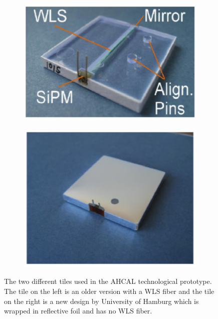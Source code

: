 \begin{figure}[htbp!]
  \centering
  \begin{subfigure}[t]{0.43\textwidth}
    \includegraphics[width=1.\linewidth]{chap3/fig/AHCALTile_old.png}
    \caption{} \label{fig:AHCALTile_old}
  \end{subfigure}
  \hspace{2cm}
  \begin{subfigure}[t]{0.37\textwidth}
    \includegraphics[width=1.\linewidth]{chap3/fig/AHCALTile_wrapped.png}
    \caption{} \label{fig:AHCALTile_new}
  \end{subfigure}
  \caption{The two different tiles used in the AHCAL technological prototype. The tile on the left is an older version with a WLS fiber and the tile on the right is a new design by University of Hamburg which is wrapped in reflective foil and has no WLS fiber.} \label{fig:TilesAHCAL2015}
\end{figure}

